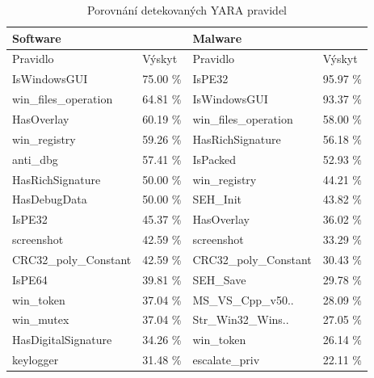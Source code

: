 \begin{table}[H]
    \caption{Porovnání detekovaných YARA pravidel}
    \label{table:yara_table}
    
    \centering
    \begin{tabular}{|l|l|l|l|}
        \hline
        \multicolumn{2}{|l|}{Software}          & \multicolumn{2}{|l|}{Malware}                     \\ \hline
        Pravidlo              & Výskyt & Pravidlo                            & Výskyt \\ 
        \hline
        \hline
        IsWindowsGUI          & 75.00 \%       & IsPE32                              & 95.97 \%       \\ \hline
        win\_files\_operation & 64.81 \%       & IsWindowsGUI                        & 93.37 \%       \\ \hline
        HasOverlay            & 60.19 \%       & win\_files\_operation               & 58.00 \%       \\ \hline
        win\_registry         & 59.26 \%       & HasRichSignature                    & 56.18 \%       \\ \hline
        anti\_dbg             & 57.41 \%       & IsPacked                            & 52.93 \%       \\ \hline
        HasRichSignature      & 50.00 \%       & win\_registry                       & 44.21 \%       \\ \hline
        HasDebugData          & 50.00 \%       & SEH\_Init                           & 43.82 \%       \\ \hline
        IsPE32                & 45.37 \%       & HasOverlay                          & 36.02 \%       \\ \hline
        screenshot            & 42.59 \%       & screenshot                          & 33.29 \%       \\ \hline
        CRC32\_poly\_Constant & 42.59 \%       & CRC32\_poly\_Constant               & 30.43 \%       \\ \hline
        IsPE64                & 39.81 \%       & SEH\_Save                           & 29.78 \%       \\ \hline
        win\_token            & 37.04 \%       & MS\_VS\_Cpp\_v50..                  & 28.09 \%       \\ \hline
        win\_mutex            & 37.04 \%       & Str\_Win32\_Wins..                  & 27.05 \%       \\ \hline
        HasDigitalSignature   & 34.26 \%       & win\_token                          & 26.14 \%       \\ \hline
        keylogger             & 31.48 \%       & escalate\_priv                      & 22.11 \%       \\ \hline
    \end{tabular}
\end{table}

